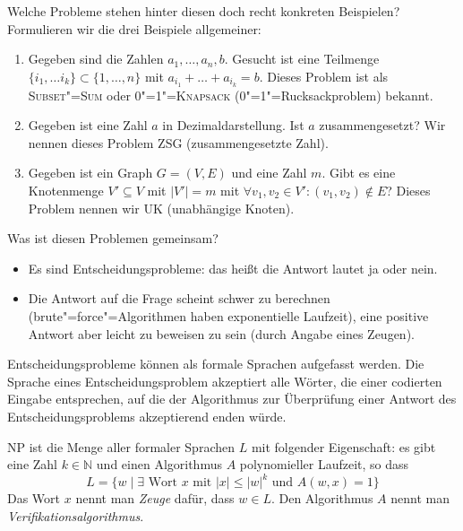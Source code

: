 Welche Probleme stehen hinter diesen doch recht konkreten Beispielen? Formulieren wir die drei Beispiele allgemeiner:
\begin{enumerate}
  \item Gegeben sind die Zahlen $a_1, \ldots, a_n, b$. Gesucht ist eine Teilmenge $\{i_1, \ldots i_k\} \subset \{ 1, \ldots, n\}$ mit $a_{i_1} + \ldots + a_{i_k} = b$. Dieses Problem ist als \textsc{Subset"=Sum} oder \textsc{0"=1"=Knapsack} (0"=1"=Rucksackproblem) bekannt.
  \item Gegeben ist eine Zahl $a$ in Dezimaldarstellung. Ist $a$ zusammengesetzt? Wir nennen dieses Problem \textsc{ZSG} (zusammengesetzte Zahl).
  \item Gegeben ist ein Graph $G=(V,E)$ und eine Zahl $m$. Gibt es eine Knotenmenge $V' \subseteq V$ mit $|V'| = m$ mit $\forall v_1, v_2 \in V' : (v_1, v_2) \notin E$? Dieses Problem nennen wir \textsc{UK} (unabhängige  Knoten).
\end{enumerate}

Was ist diesen Problemen gemeinsam?
\begin{itemize}
  \item Es sind Entscheidungsprobleme: das heißt die Antwort lautet ja oder nein.
  \item Die Antwort auf die Frage scheint schwer zu berechnen (brute"=force"=Algorithmen haben exponentielle Laufzeit), eine positive Antwort aber leicht zu beweisen zu sein (durch Angabe eines Zeugen).
\end{itemize}

Entscheidungsprobleme können als formale Sprachen aufgefasst werden. Die Sprache eines Entscheidungsproblem akzeptiert alle Wörter, die einer codierten Eingabe entsprechen, auf die der Algorithmus zur Überprüfung einer Antwort des Entscheidungsproblems akzeptierend enden würde.


\begin{Def}\label{defNP1}
  \hspace{\parindent}\textsf{NP} ist die Menge aller formaler Sprachen $L$ mit folgender Eigenschaft: es gibt eine Zahl $k \in \mathbb{N}$ und einen Algorithmus $A$ polynomieller Laufzeit, so dass \[ L = \{ w \mid \exists \text{ Wort $x$ mit } |x| \le |w|^k \text{ und } A(w,x) = 1 \} \]
  Das Wort $x$ nennt man \textit{Zeuge} dafür, dass $w \in L$. Den Algorithmus $A$ nennt man \textit{Verifikationsalgorithmus}.
\end{Def}

